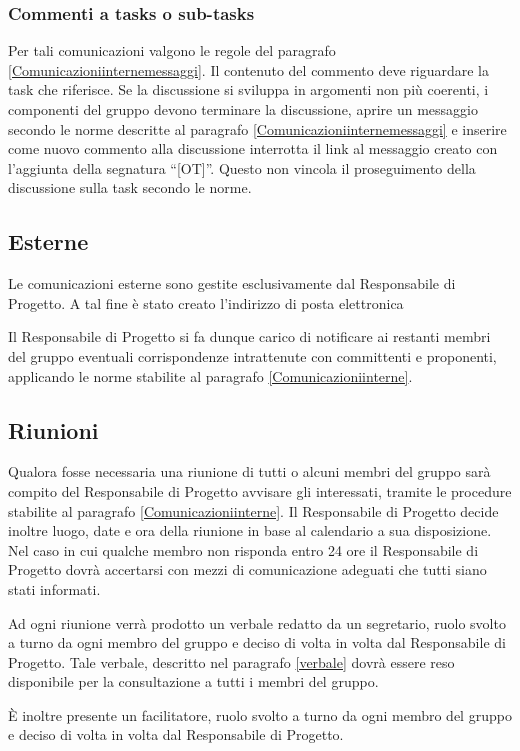 \subsubsection{Commenti a tasks o sub-tasks}

Per tali comunicazioni valgono le regole del paragrafo \ref{Comunicazioniinternemessaggi}. Il contenuto del commento deve riguardare la task che riferisce. Se la discussione si sviluppa in argomenti non più coerenti, i componenti del gruppo \GroupName{} devono terminare la discussione, aprire un messaggio secondo le norme descritte al paragrafo \ref{Comunicazioniinternemessaggi} e inserire come nuovo commento alla discussione interrotta il link al messaggio creato con l'aggiunta della segnatura ``[OT]''. Questo non vincola il proseguimento della discussione sulla task secondo le norme.

\subsection{Esterne}
\label{email}

Le comunicazioni esterne sono gestite esclusivamente dal Responsabile di Progetto. A tal fine è stato creato l'indirizzo di posta elettronica
\begin{center} \GroupEmail{} \end{center}

Il Responsabile di Progetto si fa dunque carico di notificare ai restanti membri del gruppo eventuali corrispondenze
intrattenute con committenti e proponenti, applicando le norme stabilite al paragrafo \ref{Comunicazioniinterne}.

\subsection{Riunioni}

Qualora fosse necessaria una riunione di tutti o alcuni membri del gruppo sarà compito del Responsabile di Progetto avvisare gli interessati, tramite le procedure stabilite al paragrafo \ref{Comunicazioniinterne}.
Il Responsabile di Progetto decide inoltre luogo, date e ora della riunione in base al calendario a sua disposizione. Nel caso in cui qualche membro non risponda entro 24 ore il Responsabile di Progetto dovrà accertarsi con mezzi di comunicazione adeguati che tutti siano stati informati.

Ad ogni riunione verrà prodotto un verbale redatto da un segretario, ruolo svolto a turno da ogni membro del gruppo e deciso di volta in volta dal Responsabile di Progetto. Tale verbale, descritto nel paragrafo \ref{verbale} dovrà essere reso disponibile per la consultazione a tutti i membri del gruppo.

È inoltre presente un facilitatore, ruolo svolto a turno da ogni membro del gruppo e deciso di volta in volta dal Responsabile di Progetto.
